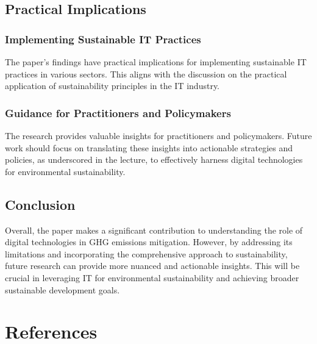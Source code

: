 \documentclass[conference,compsoc]{IEEEtran}
\begin{document}
\subsection{Practical Implications}

\subsubsection{Implementing Sustainable IT Practices}

The paper's findings have practical implications for implementing sustainable IT practices in various sectors. This aligns with the  discussion on the practical application of sustainability principles in the IT industry.

\subsubsection{Guidance for Practitioners and Policymakers}

The research provides valuable insights for practitioners and policymakers. Future work should focus on translating these insights into actionable strategies and policies, as underscored in the lecture, to effectively harness digital technologies for environmental sustainability.

\subsection{Conclusion}

Overall, the paper makes a significant contribution to understanding the role of digital technologies in GHG emissions mitigation. However, by addressing its limitations and incorporating the  comprehensive approach to sustainability, future research can provide more nuanced and actionable insights. This will be crucial in leveraging IT for environmental sustainability and achieving broader sustainable development goals.

\section*{References}
\end{document}
